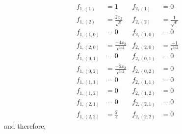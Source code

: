 \documentclass[12pt]{article}
\begin{document}
\begin{equation}
\begin{aligned}
f_{1,(1)} &= 1
&
f_{2,(1)} &= 0
\\
f_{1,(2)} &= \frac{2 x_2}{\sqrt{\epsilon}}
&
f_{2,(2)} &= \frac{1}{\sqrt{\epsilon}}
\\
f_{1,(1,0)} &= 0
&
f_{2,(1,0)} &= 0
\\
f_{1,(2,0)} &= \frac{-4 x_2}{\epsilon^{3/2}} 
&
f_{2,(2,0)} &= \frac{-1}{\epsilon^{3/2}}
\\
f_{1,(0,1)} &= 0
&
f_{2,(0,1)} &= 0
\\
f_{1,(0,2)} &= \frac{-2 x_2}{\epsilon^{3/2}} 
&
f_{2,(0,2)} &= 0
\\
f_{1,(1,1)} &= 0
&
f_{2,(1,1)} &= 0
\\
f_{1,(1,2)} &= 0
&
f_{2,(1,2)} &= 0
\\
f_{1,(2,1)} &= 0
&
f_{2,(2,1)} &= 0
\\
f_{1,(2,2)} &= \frac{2}{\epsilon}
&
f_{2,(2,2)} &= 0
\end{aligned}
\end{equation}
%
and therefore, 
%
\end{document}

